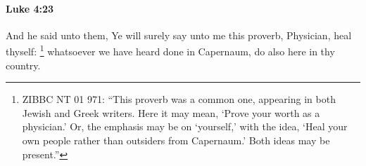 			\begin{framed}
			\scriptsize
				\begin{compactdesc}
					\item[SBLG] 
				\end{compactdesc}
			\end{framed}

		\paragraph{Luke 4:23} %
			\label{LUKE-4-23}

			And he said unto them, Ye will surely say unto me this proverb, Physician, heal thyself:%
				\footnote{%
					ZIBBC NT 01 971: ``This proverb was a common one, appearing in both Jewish and Greek writers. Here it may mean, `Prove your worth as a physician.' Or, the emphasis may be on `yourself,' with the idea, `Heal your own people rather than outsiders from Capernaum.' Both ideas may be present.''
					}
			whatsoever we have heard done in Capernaum, do also here in thy country.

